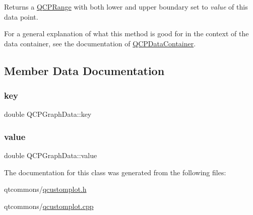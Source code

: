 Returns a \mbox{\hyperlink{class_q_c_p_range}{Q\+C\+P\+Range}} with both lower and upper boundary set to {\itshape value} of this data point.

For a general explanation of what this method is good for in the context of the data container, see the documentation of \mbox{\hyperlink{class_q_c_p_data_container}{Q\+C\+P\+Data\+Container}}. 

\subsection{Member Data Documentation}
\mbox{\label{class_q_c_p_graph_data_a2fcebdf84af975761c0661237d7e28ec}} 
\subsubsection{\texorpdfstring{key}{key}}
{\footnotesize\ttfamily double Q\+C\+P\+Graph\+Data\+::key}

\mbox{\label{class_q_c_p_graph_data_ac97e3ddbdcbe0b58d0b4d6f95250d59c}} 
\subsubsection{\texorpdfstring{value}{value}}
{\footnotesize\ttfamily double Q\+C\+P\+Graph\+Data\+::value}



The documentation for this class was generated from the following files\+:\begin{DoxyCompactItemize}
\item 
qtcommons/\mbox{\hyperlink{qcustomplot_8h}{qcustomplot.\+h}}\item 
qtcommons/\mbox{\hyperlink{qcustomplot_8cpp}{qcustomplot.\+cpp}}\end{DoxyCompactItemize}
